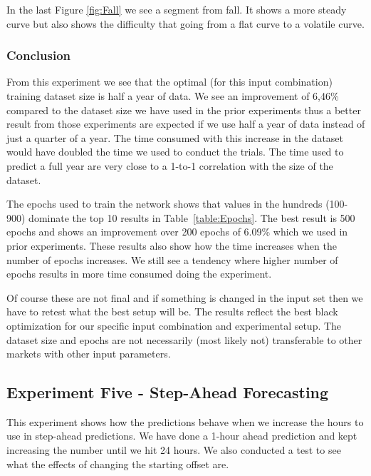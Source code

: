 In the last Figure \ref{fig:Fall} we see a segment from fall. It shows a more steady curve but also shows the difficulty that going from a flat curve to a volatile curve.

\subsubsection{Conclusion}
From this experiment we see that the optimal (for this input combination) training dataset size is half a year of data. We see an improvement of 6,46\% compared to the dataset size we have used in the prior experiments thus a better result from those experiments are expected if we use half a year of data instead of just a quarter of a year. The time consumed with this increase in the dataset would have doubled the time we used to conduct the trials. The time used to predict a full year are very close to a 1-to-1 correlation with the size of the dataset. 

The epochs used to train the network shows that values in the hundreds (100-900) dominate the top 10 results in Table~\ref{table:Epochs}. The best result is 500 epochs and shows an improvement over 200 epochs of 6.09\% which we used in prior experiments. These results also show how the time increases when the number of epochs increases. We still see a tendency where higher number of epochs results in more time consumed doing the experiment.

Of course these are not final and if something is changed in the input set then we have to retest what the best setup will be. The results reflect the best black optimization for our specific input combination and experimental setup. The dataset size and epochs are not necessarily (most likely not) transferable to other markets with other input parameters. 

\newpage
\subsection{Experiment Five - Step-Ahead Forecasting}
\label{sec:priceExperimentFive}
This experiment shows how the predictions behave when we increase the hours to use in step-ahead predictions. We have done a 1-hour ahead prediction and kept increasing the number until we hit 24 hours. We also conducted a test to see what the effects of changing the starting offset are.

